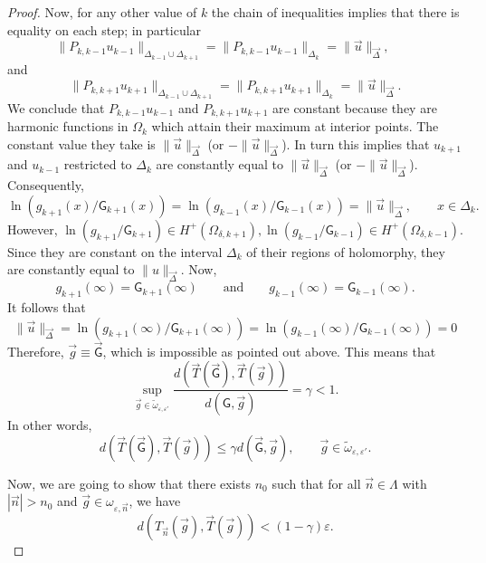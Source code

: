 \documentclass{amsart}
\numberwithin{equation}{section}
\theoremstyle{definition}
\newcommand{\n}{\vec{n}}          %
\begin{document}
\begin{proof}
Now, for any other value of $k$ the chain of inequalities implies that there is equality on each step; in particular
 \[
 \|P_{k,k-1}u_{k-1}\|_{\Delta_{k-1}\cup\Delta_{k+1}} =  \|P_{k,k-1}u_{k-1}\|_{\Delta_{k} } = \|\vec{u}\|_{\vec{\Delta}}, \qquad
 \]
 and
 \[
 \|P_{k,k+1}u_{k+1}\|_{\Delta_{k-1}\cup\Delta_{k+1}} =  \|P_{k,k+1}u_{k+1}\|_{\Delta_{k}} = \|\vec{u}\|_{\vec{\Delta}}.
 \]
 We conclude that $P_{k,k-1}u_{k-1}$ and $P_{k,k+1}u_{k+1}$ are constant because they are harmonic functions in $\Omega_k$ which attain their maximum at interior points. The constant value they take is $\|\vec{u}\|_{\vec{\Delta}}$ (or  $-\|\vec{u}\|_{\vec{\Delta}}$). In turn this implies that $u_{k+1}$ and $u_{k-1}$ restricted to $\Delta_k$ are constantly equal to $\|\vec{u}\|_{\vec{\Delta}}$ (or  $-\|\vec{u}\|_{\vec{\Delta}}$).  Consequently,
 \[
 \ln(g_{k+1}(x)/\mathsf{G}_{k+1}(x)) = \ln(g_{k-1}(x)/\mathsf{G}_{k-1}(x)) = \|\vec{u}\|_{\vec{\Delta}}, \qquad x \in \Delta_k.
 \]
 However, $\ln(g_{k+1} /\mathsf{G}_{k+1} ) \in H^+(\Omega_{\delta,k+1}), \ln(g_{k-1} /\mathsf{G}_{k-1} ) \in H^+(\Omega_{\delta,k-1}) $. Since they are constant on the interval $\Delta_k$ of their regions of holomorphy, they are constantly equal to $\|u\|_{\vec{\Delta}}$.
 Now,
 \[
 g_{k+1}(\infty) =   \mathsf{G}_{k+1}(\infty) \qquad \mbox{and} \qquad
   g_{k-1}(\infty)   =   \mathsf{G}_{k-1}(\infty).
 \]
 It follows that
 \[
 \|\vec{u}\|_{\vec{\Delta}} = \ln(g_{k+1}(\infty)/\mathsf{G}_{k+1}(\infty))  =  \ln(g_{k-1}(\infty)/\mathsf{G}_{k-1}(\infty)) = 0
 \]
 Therefore, $\vec{g} \equiv \vec{\mathsf{G}}$, which is impossible as pointed out above. This means that
 \[
 \sup_{\vec{g} \in \tilde{\omega}_{\varepsilon,\varepsilon'}} \frac{d(\vec{T}(\vec{\mathsf{G}}), \vec{T}(\vec{g}))}{d(\mathsf{G},  \vec{g})} = \gamma < 1.
 \]
 In other words,
 \begin{equation}
 	\label{gamma}
 	d(\vec{T}(\vec{\mathsf{G}}), \vec{T}(\vec{g})) \leq \gamma d(\vec{ \mathsf{G}},  \vec{g}), \qquad \vec{g} \in \tilde{\omega}_{\varepsilon,\varepsilon'}.
 \end{equation}


Now, we are going to show that there exists $n_0$ such that for all $\n \in \Lambda$ with $|\n|>n_0$ and $\vec{g}\in\omega_{\varepsilon, \n}$, we have
 	\begin{equation}
 		\label{desig}
 		d(T_{\n}(\vec{g}), \vec{T} (\vec{g}))< (1-\gamma)\varepsilon.
 	\end{equation}
 	

\end{proof}
\end{document}
